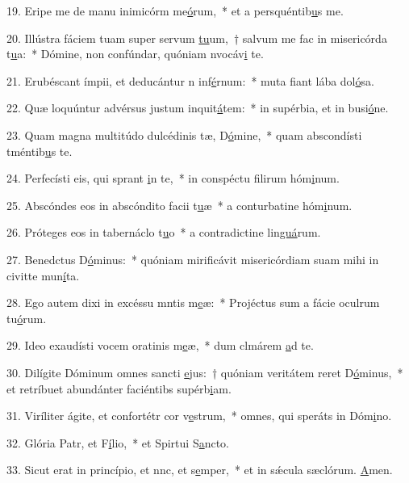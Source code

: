 19. Eripe me de manu inimicórm me\uline{ó}rum,~* et a persquéntib\uline{u}s me.\par 
20. Illústra fáciem tuam super servum \uline{tu}um,~† salvum me fac in misericórda t\uline{u}a:~* Dómine, non confúndar, quóniam nvocáv\uline{i} te.\par 
21. Erubéscant ímpii, et deducántur n inf\uline{é}rnum:~* muta fiant lába dol\uline{ó}sa.\par 
22. Quæ loquúntur advérsus justum inquit\uline{á}tem:~* in supérbia, et in busi\uline{ó}ne.\par 
23. Quam magna multitúdo dulcédinis tæ, D\uline{ó}mine,~* quam abscondísti tméntib\uline{u}s te.\par 
24. Perfecísti eis, qui sprant \uline{i}n te,~* in conspéctu filirum hóm\uline{i}num.\par 
25. Abscóndes eos in abscóndito facii t\uline{u}æ~* a conturbatine hóm\uline{i}num.\par 
26. Próteges eos in tabernáclo t\uline{u}o~* a contradictine lin\uline{guá}rum.\par 
27. Benedctus D\uline{ó}minus:~* quóniam mirificávit misericórdiam suam mihi in civitte mun\uline{í}ta.\par 
28. Ego autem dixi in excéssu mntis m\uline{e}æ:~* Projéctus sum a fácie oculrum tu\uline{ó}rum.\par 
29. Ideo exaudísti vocem oratinis m\uline{e}æ,~* dum clmárem \uline{a}d te.\par 
30. Dilígite Dóminum omnes sancti \uline{e}jus:~† quóniam veritátem reret D\uline{ó}minus,~* et retríbuet abundánter faciéntibs supérb\uline{i}am.\par 
31. Viríliter ágite, et confortétr cor v\uline{e}strum,~* omnes, qui speráts in Dóm\uline{i}no.\par 
32. Glória Patr, et F\uline{í}lio,~* et Spirtui S\uline{a}ncto.\par 
33. Sicut erat in princípio, et nnc, et s\uline{e}mper,~* et in sǽcula sæclórum. \uline{A}men.\par 
